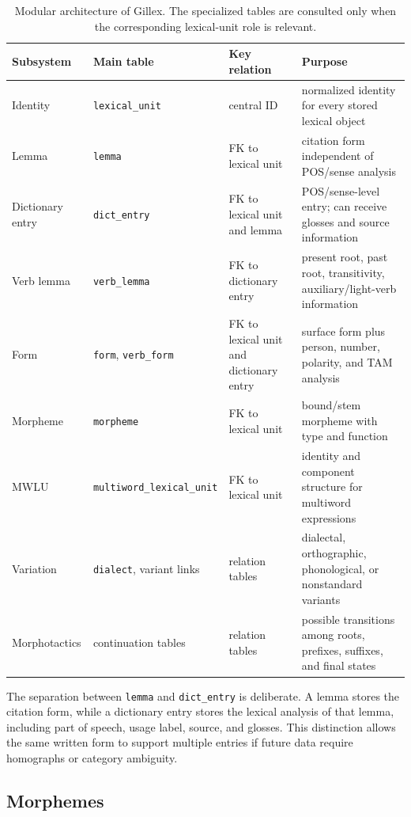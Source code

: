 \documentclass[11pt]{article}
\newcommand{\code}[1]{\texttt{#1}}
\begin{document}
\begin{table}[t]
\centering
\small
\begin{tabularx}{\linewidth}{lllX}
\toprule
Subsystem & Main table & Key relation & Purpose \\
\midrule
Identity & \code{lexical\_unit} & central ID & normalized identity for every stored lexical object \\
Lemma & \code{lemma} & FK to lexical unit & citation form independent of POS/sense analysis \\
Dictionary entry & \code{dict\_entry} & FK to lexical unit and lemma & POS/sense-level entry; can receive glosses and source information \\
Verb lemma & \code{verb\_lemma} & FK to dictionary entry & present root, past root, transitivity, auxiliary/light-verb information \\
Form & \code{form}, \code{verb\_form} & FK to lexical unit and dictionary entry & surface form plus person, number, polarity, and TAM analysis \\
Morpheme & \code{morpheme} & FK to lexical unit & bound/stem morpheme with type and function \\
MWLU & \code{multiword\_lexical\_unit} & FK to lexical unit & identity and component structure for multiword expressions \\
Variation & \code{dialect}, variant links & relation tables & dialectal, orthographic, phonological, or nonstandard variants \\
Morphotactics & continuation tables & relation tables & possible transitions among roots, prefixes, suffixes, and final states \\
\bottomrule
\end{tabularx}
\caption{Modular architecture of Gillex. The specialized tables are consulted only when the corresponding lexical-unit role is relevant.}
\label{tab:architecture}
\end{table}

The separation between \code{lemma} and \code{dict\_entry} is deliberate. A lemma stores the citation form, while a dictionary entry stores the lexical analysis of that lemma, including part of speech, usage label, source, and glosses. This distinction allows the same written form to support multiple entries if future data require homographs or category ambiguity.

\subsection{Morphemes}
\end{document}
